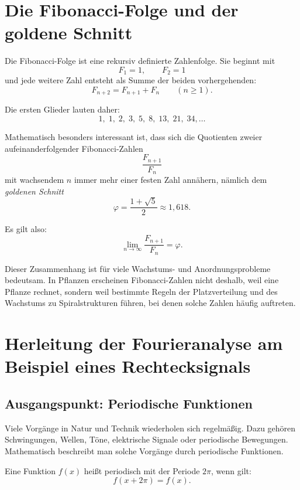 \section{Die Fibonacci-Folge und der goldene Schnitt}
\label{app:fibonacci-goldener-schnitt}

Die Fibonacci-Folge ist eine rekursiv definierte Zahlenfolge.
Sie beginnt mit
\[
F_1 = 1,\qquad F_2 = 1
\]
und jede weitere Zahl entsteht als Summe der beiden vorhergehenden:
\[
F_{n+2} = F_{n+1} + F_n \qquad (n \geq 1).
\]

Die ersten Glieder lauten daher:
\[
1,\;1,\;2,\;3,\;5,\;8,\;13,\;21,\;34,\dots
\]

Mathematisch besonders interessant ist, dass sich die Quotienten zweier aufeinanderfolgender Fibonacci-Zahlen
\[
\frac{F_{n+1}}{F_n}
\]
mit wachsendem \(n\) immer mehr einer festen Zahl annähern, nämlich dem \emph{goldenen Schnitt}
\[
\varphi = \frac{1+\sqrt{5}}{2} \approx 1{,}618.
\]

Es gilt also:
\[
\lim_{n\to\infty} \frac{F_{n+1}}{F_n} = \varphi.
\]

Dieser Zusammenhang ist für viele Wachstums- und Anordnungsprobleme bedeutsam.
In Pflanzen erscheinen Fibonacci-Zahlen nicht deshalb, weil eine Pflanze \glqq rechnet\grqq{},
sondern weil bestimmte Regeln der Platzverteilung und des Wachstums zu Spiralstrukturen führen,
bei denen solche Zahlen häufig auftreten.

\section{Herleitung der Fourieranalyse am Beispiel eines Rechtecksignals}
\label{sec:anhang_fourieranalyse_rechtecksignal}

\subsection{Ausgangspunkt: Periodische Funktionen}

Viele Vorgänge in Natur und Technik wiederholen sich regelmäßig.
Dazu gehören Schwingungen, Wellen, Töne, elektrische Signale oder periodische Bewegungen.
Mathematisch beschreibt man solche Vorgänge durch periodische Funktionen.

Eine Funktion \(f(x)\) heißt periodisch mit der Periode \(2\pi\), wenn gilt:
\[
f(x+2\pi)=f(x).
\]

